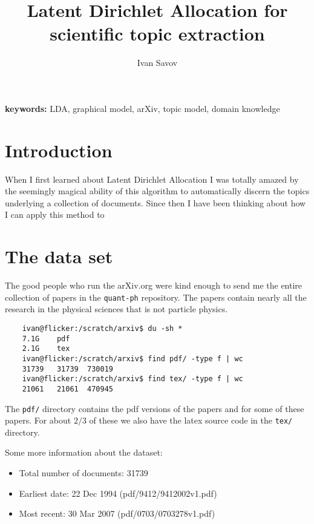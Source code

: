 \documentclass[11pt]{article}
\author{Ivan Savov}
\title{ {\Huge Latent Dirichlet Allocation for scientific topic extraction } }
\begin{document}
\maketitle



{\bf keywords: } LDA, graphical model, arXiv, topic model, domain knowledge



\section{Introduction}

	When I first learned about Latent Dirichlet Allocation I was totally amazed by the seemingly magical ability
	of this algorithm to automatically discern the topics underlying a collection of documents.
	Since then I have been thinking about how I can apply this method to  


\section{The data set}

	The good people who run the arXiv.org were kind enough to send me the entire collection of papers
	in the \texttt{quant-ph} repository. The papers contain nearly all the research in the physical sciences
	that is not particle physics.
	 
	\begin{verbatim}
	ivan@flicker:/scratch/arxiv$ du -sh *
	7.1G    pdf
	2.1G    tex
	ivan@flicker:/scratch/arxiv$ find pdf/ -type f | wc
	31739   31739  730019
	ivan@flicker:/scratch/arxiv$ find tex/ -type f | wc
	21061   21061  470945
	\end{verbatim}
	
	The \texttt{pdf/} directory contains the pdf versions of the papers and for some of these papers.
	For about $2/3$ of these we also have the latex source code in the \texttt{tex/} directory.
	
	Some more information about the dataset:
	\begin{itemize}
		\item Total number of documents: 31739
		\item Earliest date: 22 Dec 1994  (pdf/9412/9412002v1.pdf)
		\item Most recent:  30 Mar 2007 (pdf/0703/0703278v1.pdf)
	\end{itemize}
	
\end{document}
